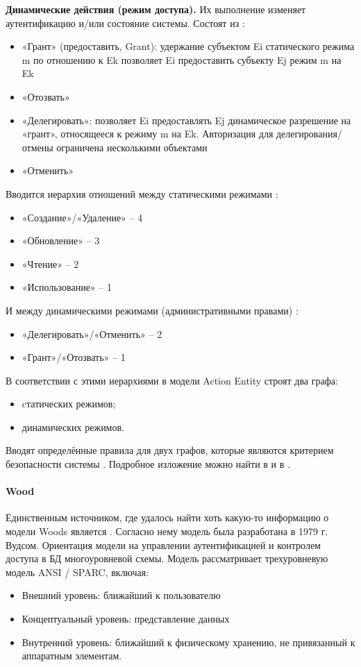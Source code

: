 \textbf{Динамические действия (режим доступа).} Их выполнение изменяет аутентификацию и/или состояние системы.
Состоят из \autocite{SecModels}:
\begin{itemize}
    \item «Грант» (предоставить, Grant): удержание субъектом Ei статического режима m по отношению к Ek 
    позволяет Ei предоставить субъекту Ej режим m на Ek
    \item «Отозвать»
    \item «Делегировать»: позволяет Ei предоставлять Ej динамическое разрешение на «грант», относящееся к режиму m 
    на Ek. Авторизация для делегирования/отмены ограничена несколькими объектами
    \item «Отменить»
\end{itemize}

Вводится иерархия отношений между статическими режимами \autocite{Jalili}:
\begin{itemize}
    \item «Создание»/«Удаление» -- 4
    \item «Обновление» -- 3
    \item «Чтение» -- 2
    \item «Использование» -- 1
\end{itemize}

И между динамическими режимами (административными правами) \autocite{Jalili}:
\begin{itemize}
    \item «Делегировать»/«Отменить» -- 2
    \item «Грант»/«Отозвать» -- 1
\end{itemize}

В соответствии с этими иерархиями в модели Action Entity строят два графа:
\begin{itemize}
    \item cтатических режимов;
    \item динамических режимов.
\end{itemize}

Вводят определённые правила для двух графов, которые являются критерием безопасности системы \autocite{SecModels}.
Подробное изложение можно найти в \autocite{SecModels} и в \autocite{Jalili}.

\paragraph{Wood}

Единственным источником, где удалось найти хоть какую-то информацию о модели Woods является \autocite{Jalili}. 
Согласно нему модель была разработана в 1979 г. Вудсом. Ориентация модели на управлении аутентификацией и контролем 
доступа в БД многоуровневой схемы. Модель рассматривает трехуровневую модель ANSI / SPARC, включая:
\begin{itemize}
    \item Внешний уровень: ближайший к пользователю
    \item Концептуальный уровень: представление данных
    \item Внутренний уровень: ближайший к физическому хранению, не привязанный к аппаратным элементам.
\end{itemize}

